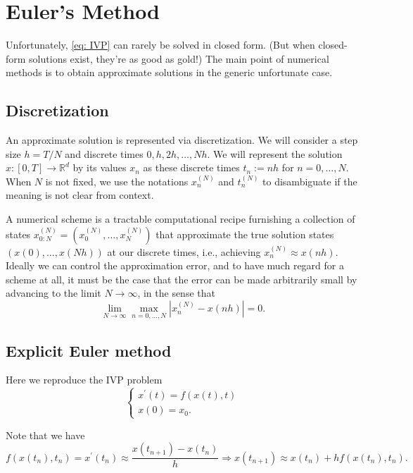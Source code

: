\chapter{Euler's Method}
Unfortunately, \eqref{eq: IVP} can rarely be solved in closed form. (But when closed-form solutions exist, they're as good as gold!) The main point of numerical methods is to obtain approximate solutions in the generic unfortunate case. 

\section{Discretization} 
 
An approximate solution is represented via discretization. We will consider a step size $h=T / N$ and discrete times $0, h, 2 h, \ldots, N h$. We will represent the solution $x:[0, T] \rightarrow \mathbb{R}^d$ by its values $x_n$ as these discrete times $t_n:=n h$ for $n=0, \ldots, N$. When $N$ is not fixed, we use the notations $x_n^{(N)}$ and $t_n^{(N)}$ to disambiguate if the meaning is not clear from context. 

A numerical scheme is a tractable computational recipe furnishing a collection of states $x_{0: N}^{(N)}=(x_0^{(N)}, \ldots, x_N^{(N)})$ that approximate the true solution states $(x(0), \ldots, x(N h))$ at our discrete times, i.e., achieving $x_n^{(N)} \approx x(n h)$. Ideally we can control the approximation error, and to have much regard for a scheme at all, it must be the case that the error can be made arbitrarily small by advancing to the limit $N \rightarrow \infty$, in the sense that
$$
\lim _{N \rightarrow \infty} \max _{n=0, \ldots, N}\left|x_n^{(N)}-x(n h)\right|=0. 
$$

\section{Explicit Euler method}
Here we reproduce the IVP problem 
\begin{equation}
\label{eq: IVP euler}
    \begin{cases}
        x^\prime (t) = f(x(t),t) \\
        x(0) = x_0 .
    \end{cases}
\end{equation}

Note that we have 
\[
    f(x(t_n),t_n) = x^\prime (t_n) \approx \frac{x(t_{n+1}) - x(t_n)}{h}\Rightarrow x(t_{n+1}) \approx x(t_{n}) + h f(x(t_n), t_n). 
\]



